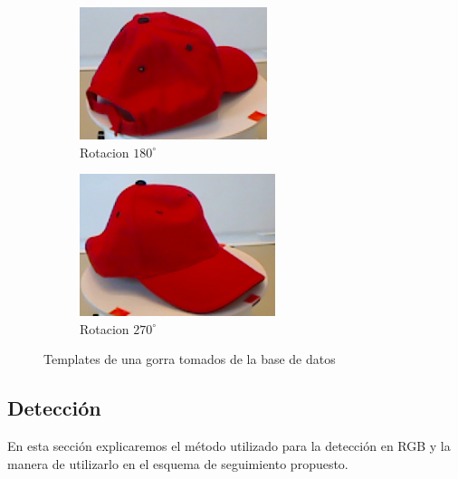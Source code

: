 \begin{figure}
	\begin{subfigure}[b]{0.25\textwidth}
		\includegraphics[width=\textwidth]{img/templates/180_crop.png}
		\caption{Rotacion $180^{\circ}$}
	\end{subfigure}
	\quad
	\begin{subfigure}[b]{0.25\textwidth}
		\includegraphics[width=\textwidth]{img/templates/270_crop.png}
		\caption{Rotacion $270^{\circ}$}
	\end{subfigure}
	\caption{Templates de una gorra tomados de la base de datos}
	\label{templates_objeto}
\end{figure}

\subsection{Detección}\label{deteccion_rgb}
En esta sección explicaremos el método utilizado para la detección en RGB y la manera de utilizarlo en el esquema de seguimiento propuesto.


